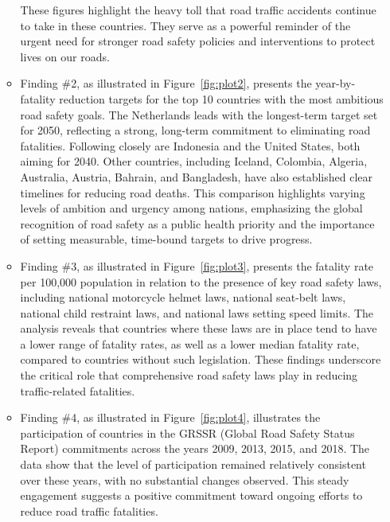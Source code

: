 \documentclass[a4paper,10pt]{article}\setlength{\textheight}{10in}\setlength{\textwidth}{6.5in}\setlength{\topmargin}{-0.125in}\setlength{\oddsidemargin}{-.2in}\setlength{\evensidemargin}{-.2in}\setlength{\headsep}{0.2in}\setlength{\footskip}{0pt}\usepackage{amsmath}\usepackage{fancyhdr}\usepackage{enumitem}\usepackage{hyperref}\usepackage{xcolor}\usepackage{graphicx}\usepackage[export]{adjustbox}\usepackage{caption}\usepackage{float}\usepackage{booktabs}\usepackage{makecell}\pagestyle{fancy}
\begin{document}
\begin{enumerate}[topsep=0mm, partopsep=0mm, leftmargin=*]
\begin{itemize}
These figures highlight the heavy toll that road traffic accidents continue to take in these countries. They serve as a powerful reminder of the urgent need for stronger road safety policies and interventions to protect lives on our roads.

        \item Finding \#2, as illustrated in Figure~\ref{fig:plot2}, presents the year-by-fatality reduction targets for the top 10 countries with the most ambitious road safety goals. The Netherlands leads with the longest-term target set for 2050, reflecting a strong, long-term commitment to eliminating road fatalities. Following closely are Indonesia and the United States, both aiming for 2040. Other countries, including Iceland, Colombia, Algeria, Australia, Austria, Bahrain, and Bangladesh, have also established clear timelines for reducing road deaths. This comparison highlights varying levels of ambition and urgency among nations, emphasizing the global recognition of road safety as a public health priority and the importance of setting measurable, time-bound targets to drive progress.
        

        \item Finding \#3, as illustrated in Figure~\ref{fig:plot3}, presents the fatality rate per 100,000 population in relation to the presence of key road safety laws, including national motorcycle helmet laws, national seat-belt laws, national child restraint laws, and national laws setting speed limits. The analysis reveals that countries where these laws are in place tend to have a lower range of fatality rates, as well as a lower median fatality rate, compared to countries without such legislation. These findings underscore the critical role that comprehensive road safety laws play in reducing traffic-related fatalities.
        
        \item Finding \#4, as illustrated in Figure~\ref{fig:plot4},  illustrates the participation of countries in the GRSSR (Global Road Safety Status Report) commitments across the years 2009, 2013, 2015, and 2018. The data show that the level of participation remained relatively consistent over these years, with no substantial changes observed. This steady engagement suggests a positive commitment toward ongoing efforts to reduce road traffic fatalities.
    \end{itemize}







\end{enumerate}
\end{document}
